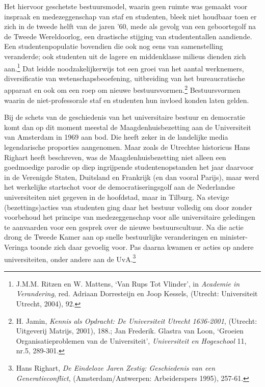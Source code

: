 \documentclass[smallauthor, chapterhaspagenum, nochapterinheader, pagenuminheader,  bigchapnum,medium2, tocpages,  garamond, titleinheader]{jote-book}
\begin{document}
	Het hiervoor geschetste bestuursmodel, waarin geen ruimte was gemaakt voor inspraak en medezeggenschap van staf en studenten, bleek niet houdbaar toen er zich in de tweede helft van de jaren '60, mede als gevolg van een geboortegolf na de Tweede Wereldoorlog, een drastische stijging van studententallen aandiende. Een studentenpopulatie bovendien die ook nog eens van samenstelling veranderde; ook studenten uit de lagere en middenklasse milieus dienden zich aan.\footnote{J.M.M. Ritzen en W. Mattens, ‘Van Rups Tot Vlinder', in \emph{Academie in Verandering}, red. Adriaan Dorresteijn en Joop Kessels, (Utrecht: Universiteit Utrecht, 2004), 92.} Dat leidde noodzakelijkerwijs tot een groei van het aantal werknemers, diversificatie van wetenschapsbeoefening, uitbreiding van het bureaucratische apparaat en ook om een roep om nieuwe bestuursvormen.\footnote{H. Jamin, \emph{Kennis als Opdracht: De Universiteit Utrecht 1636-2001}, (Utrecht: Uitgeverij Matrijs, 2001), 188.; Jan Frederik. Glastra van Loon, ‘Groeien Organisatieproblemen van de Universiteit', \emph{Universiteit en Hogeschool} 11, nr.5, 289-301.} Bestuursvormen waarin de niet-professorale staf en studenten hun invloed konden laten gelden.



	Bij de schets van de geschiedenis van het universitaire bestuur en democratie komt dan op dit moment meestal de Maagdenhuisbezetting aan de Universiteit van Amsterdam in 1969 aan bod. Die heeft zeker in de landelijke media legendarische proporties aangenomen. Maar zoals de Utrechtse historicus Hans Righart heeft beschreven, was de Maagdenhuisbezetting niet alleen een goedmoedige parodie op diep ingrijpende studentenopstanden het jaar daarvoor in de Verenigde Staten, Duitsland en Frankrijk (en dan vooral Parijs), maar werd het werkelijke startschot voor de democratiseringsgolf aan de Nederlandse universiteiten niet gegeven in de hoofdstad, maar in Tilburg. Na stevige (bezettings)acties van studenten ging daar het bestuur volledig om door zonder voorbehoud het principe van medezeggenschap voor alle universitaire geledingen te aanvaarden voor een gesprek over de nieuwe bestuurscultuur. Na die actie drong de Tweede Kamer aan op snelle bestuurlijke veranderingen en minister-Veringa toonde zich daar gevoelig voor. Pas daarna kwamen er acties op andere universiteiten, onder andere aan de UvA.\footnote{Hans Righart, \emph{De Eindeloze Jaren Zestig: Geschiedenis van een Generatieconflict}, (Amsterdam/Antwerpen: Arbeiderspers 1995), 257-61.}
\end{document}
